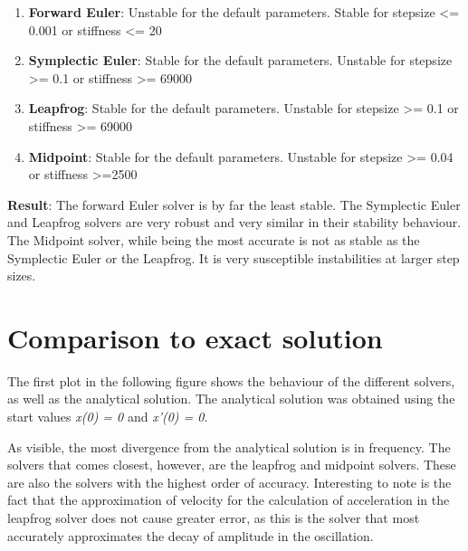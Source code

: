 \documentclass[11pt]{article}
\begin{document}
\begin{enumerate}
\item
  \textbf{Forward Euler}: Unstable for the default parameters. Stable
  for stepsize \textless{}= 0.001 or stiffness \textless{}= 20
\item
  \textbf{Symplectic Euler}: Stable for the default parameters. Unstable
  for stepsize \textgreater{}= 0.1 or stiffness \textgreater{}= 69000
\item
  \textbf{Leapfrog}: Stable for the default parameters. Unstable for
  stepsize \textgreater{}= 0.1 or stiffness \textgreater{}= 69000
\item
  \textbf{Midpoint}: Stable for the default parameters. Unstable for
  stepsize \textgreater{}= 0.04 or stiffness \textgreater{}=2500
\end{enumerate}

\textbf{Result}: The forward Euler solver is by far the least stable.
The Symplectic Euler and Leapfrog solvers are very robust and very
similar in their stability behaviour. The Midpoint solver, while being
the most accurate is not as stable as the Symplectic Euler or the
Leapfrog. It is very susceptible instabilities at larger step sizes.

\section{Comparison to exact
solution}\label{comparison-to-exact-solution}

The first plot in the following figure shows the behaviour of the
different solvers, as well as the analytical solution. The analytical
solution was obtained using the start values \emph{x(0) = 0} and
\emph{x'(0) = 0}.

As visible, the most divergence from the analytical solution is in
frequency. The solvers that comes closest, however, are the leapfrog and
midpoint solvers. These are also the solvers with the highest order of
accuracy. Interesting to note is the fact that the approximation of
velocity for the calculation of acceleration in the leapfrog solver does
not cause greater error, as this is the solver that most accurately
approximates the decay of amplitude in the oscillation.
\end{document}
